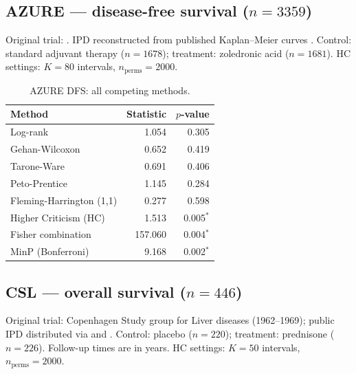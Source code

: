 \documentclass[11pt]{article}
\newcommand{\sig}{$^{\ast}$}
\begin{document}
\subsection*{AZURE --- disease-free survival ($n=3359$)}

Original trial: \citet{coleman2011,coleman2014}.
IPD reconstructed from published Kaplan--Meier curves
\citep{guyot2012}.
Control: standard adjuvant therapy ($n=1678$); treatment: zoledronic acid
($n=1681$).  HC settings: $K=80$ intervals, $n_\mathrm{perms}=2000$.

\begin{table}[h]
  \centering
  \caption{AZURE DFS: all competing methods.}
  \label{tab:azure}
  \begin{tabular}{@{}lrr@{}}
    \toprule
    Method & Statistic & $p$-value \\
    \midrule
    Log-rank                         &  1.054 & 0.305 \\
    Gehan-Wilcoxon                   &  0.652 & 0.419 \\
    Tarone-Ware                      &  0.691 & 0.406 \\
    Peto-Prentice                    &  1.145 & 0.284 \\
    Fleming-Harrington (1,1)         &  0.277 & 0.598 \\
    Higher Criticism (HC)            &  1.513 & 0.005\sig \\
    Fisher combination               & 157.060 & 0.004\sig \\
    MinP (Bonferroni)                &  9.168 & 0.002\sig \\
    \bottomrule
  \end{tabular}
\end{table}

\subsection*{CSL --- overall survival ($n=446$)}

Original trial: Copenhagen Study group for Liver diseases (1962--1969);
public IPD distributed via \citet{csl_data} and \citet{survset2022}.
Control: placebo ($n=220$); treatment: prednisone ($n=226$).
Follow-up times are in years.  HC settings: $K=50$ intervals,
$n_\mathrm{perms}=2000$.
\end{document}
